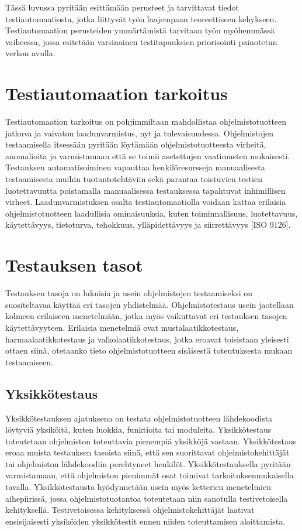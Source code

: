 Tässä luvussa pyritään esittämään perusteet ja tarvittavat tiedot testiautomaatiosta, jotka liittyvät työn laajempaan teoreettiseen kehykseen.
Testiautomaation perusteiden ymmärtämistä tarvitaan työn myöhemmässä vaiheessa, jossa esitetään varsinainen testitapauksien priorisointi painotetun verkon avulla.

\section{Testiautomaation tarkoitus}

Testiautomaation tarkoitus on pohjimmiltaan mahdollistaa ohjelmistotuotteen jatkuva ja vaivaton laadunvarmistus, nyt ja tulevaisuudessa.
Ohjelmistojen testaamisella itsessään pyritään löytämään ohjelmistotuotteesta virheitä, anomalioita ja varmistamaan että se toimii asetettujen vaatimusten mukaisesti.
Testauksen automatisoiminen vapauttaa henkilöresursseja manuaalisesta testaamisesta muihin tuotantotehtäviin sekä parantaa toistuvien testien luotettavuutta poistamalla manuaalisessa testauksessa tapahtuvat inhimillisen virheet.
Laadunvarmistuksen osalta testiautomaatiolla voidaan kattaa erilaisia ohjelmistotuotteen laadullisia ominaisuuksia, kuten toiminnallisuus, luotettavuus, käytettävyys, tietoturva, tehokkuus, ylläpidettävyys ja siirrettävyys [ISO 9126].

\section{Testauksen tasot}

Testauksen tasoja on lukuisia ja usein ohjelmistojen testaamiseksi on suositeltavaa käyttää eri tasojen yhdistelmää.
Ohjelmistotestaus usein jaotellaan kolmeen erilaiseen menetelmään, jotka myös vaikuttavat eri testauksen tasojen käytettävyyteen.
Erilaisia menetelmiä ovat mustalaatikkotestaus, harmaalaatikkotestaus ja valkolaatikkotestaus, jotka eroavat toisistaan yleisesti ottaen siinä, otetaanko tieto ohjelmistotuotteen sisäisestä toteutuksesta mukaan testaamiseen.

  \subsection{Yksikkötestaus}

  Yksikkötestauksen ajatuksena on testata ohjelmistotuotteen lähdekoodista löytyviä yksiköitä, kuten luokkia, funktioita tai moduleita.
  Yksikkötestaus toteutetaan ohjelmiston toteuttavia pienempiä yksikköjä vastaan.
  Yksikkötestaus eroaa muista testauksen tasoista siinä, että sen suorittavat ohjelmistokehittäjät tai ohjelmiston lähdekoodiin perehtyneet henkilöt.
  Yksikkötestauksella pyritään varmistamaan, että ohjelmiston pienimmät osat toimivat tarkoituksenmukaisella tavalla.
  Yksikkötestausta hyödynnetään usein myös ketterien menetelmien aihepiirissä, jossa ohjelmistotuotantoa toteutetaan niin sanotulla testivetoisella kehityksellä.
  Testivetoisessa kehityksessä ohjelmistokehittäjät laativat ensisijaisesti yksiköiden yksikkötestit ennen niiden toteuttamisen aloittamista.

